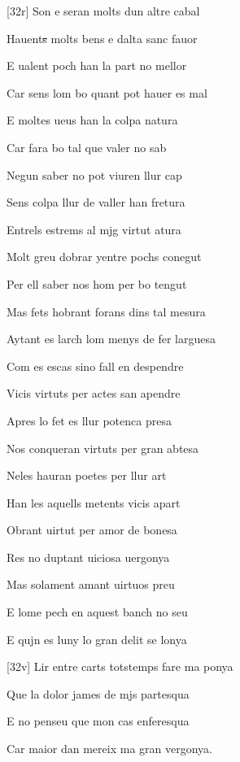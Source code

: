 \documentclass[12pt]{article}
\begin{document}
\begin{estrofa}

 [32r] Son e seran molts dun altre cabal

 Hauent\sout{s} molts bens e dalta sanc fauor

 E ualent poch han la part no mellor

 Car sens lom bo quant pot hauer es mal

 E moltes ueus han la colpa natura

 Car fara bo tal que valer no sab

 Negun saber no pot viuren llur cap

 Sens colpa llur de valler han fretura

\end{estrofa}



\begin{estrofa}

 Entrels estrems al mjg virtut atura

 Molt greu dobrar yentre pochs conegut

 Per ell saber nos hom per bo tengut

 Mas fets hobrant forans dins tal mesura

 Aytant es larch lom menys de fer larguesa

 Com es escas sino fall en despendre

 Vicis virtuts per actes san apendre

 Apres lo fet es llur potenca presa

\end{estrofa}



\begin{estrofa}

 Nos conqueran virtuts per gran abtesa

 Neles hauran poetes per llur art

 Han les aquells metents vicis apart

 Obrant uirtut per amor de bonesa

 Res no duptant uiciosa uergonya

 Mas solament amant uirtuos preu

 E lome pech en aquest banch no seu

 E qujn es luny lo gran delit se lonya

\end{estrofa}



\begin{estrofa}

 [32v] Lir entre carts totstemps fare ma ponya

 Que la dolor james de mjs partesqua

 E no penseu que mon cas enferesqua

 Car maior dan mereix ma gran vergonya.

\end{estrofa}
\end{document}
